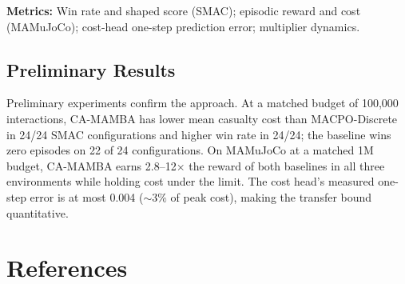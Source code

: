 \documentclass[12pt,a4paper]{article}
\begin{document}
\textbf{Metrics:} Win rate and shaped score (SMAC); episodic reward and cost (MAMuJoCo); cost-head one-step prediction error; multiplier dynamics.

\subsection{Preliminary Results}

Preliminary experiments confirm the approach.
At a matched budget of 100,000 interactions, CA-MAMBA has lower mean casualty cost than MACPO-Discrete in 24/24 SMAC configurations and higher win rate in 24/24; the baseline wins zero episodes on 22 of 24 configurations.
On MAMuJoCo at a matched 1M budget, CA-MAMBA earns 2.8--12$\times$ the reward of both baselines in all three environments while holding cost under the limit.
The cost head's measured one-step error is at most 0.004 (${\sim}3\%$ of peak cost), making the transfer bound quantitative.

\section*{References}
\end{document}

